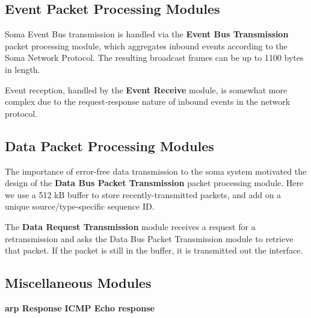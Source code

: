 \subsection{Event Packet Processing Modules}
Soma Event Bus transmission is handled via the \textbf{Event Bus
  Transmission} packet processing module, which aggregates inbound
events according to the Soma Network Protocol. The resulting broadcast
frames can be up to 1100 bytes in length.

Event reception, handled by the \textbf{Event Receive} module, is
somewhat more complex due to the request-response nature of inbound
events in the network protocol. 

\subsection{Data Packet Processing Modules} 
The importance of error-free data transmission to the soma system
motivated the design of the \textbf{Data Bus Packet Transmission}
packet processing module. Here we use a 512 kB buffer to store
recently-transmitted packets, and add on a unique source/type-specific
sequence ID.

The \textbf{Data Request Transmission} module receives a request for a
retransmission and asks the Data Bus Packet Transmission module to
retrieve that packet. If the packet is still in the buffer, it is
transmitted out the interface.

\subsection{Miscellaneous Modules}
\textbf{arp Response}
\textbf{ICMP Echo response}

